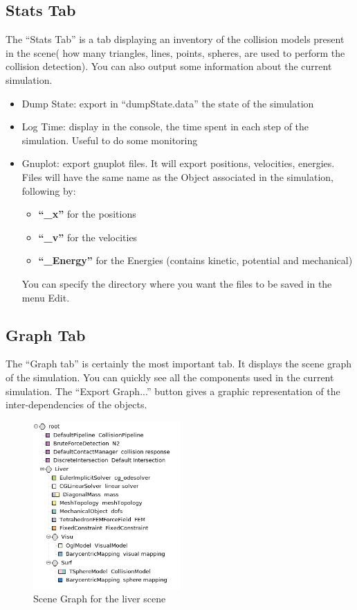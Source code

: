 \subsection{Stats Tab}
The ``Stats Tab'' is a tab displaying an inventory of the collision models present in the scene( how many triangles, lines, points, spheres, are used to perform the collision detection). You can also output some information about the current simulation. 
\begin{itemize}
 \item Dump State: export in ``dumpState.data'' the state of the simulation
 \item Log Time: display in the console, the time spent in each step of the simulation. Useful to do some monitoring
 \item Gnuplot: export gnuplot files. It will export positions, velocities, energies. Files will have the same name as the Object associated in the simulation, following by:
\begin{itemize}
 \item {\bf ``\_x''} for the positions
 \item {\bf ``\_v''} for the velocities
 \item {\bf ``\_Energy''} for the Energies (contains kinetic, potential and mechanical)
\end{itemize}

You can specify the directory where you want the files to be saved in the menu Edit.
\end{itemize}











\subsection{Graph Tab}
The ``Graph tab'' is certainly the most important tab. It displays the scene graph of the simulation. You can quickly see all the components used in the current simulation. The ``Export Graph...'' button gives a graphic representation of the inter-dependencies of the objects.

\begin{figure}[htpb]
	\centering
		\includegraphics[width=0.5\textwidth]{GUI/GUI_graph.png}
	\caption{Scene Graph for the liver scene}
\end{figure}

